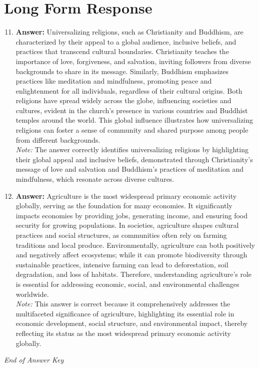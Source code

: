 \documentclass[12pt]{article}
\begin{document}
\section*{Long Form Response}
\begin{enumerate}[label=\arabic*.]
\setcounter{enumi}{10}
\item \textbf{Answer:} Universalizing religions, such as Christianity and Buddhism, are characterized by their appeal to a global audience, inclusive beliefs, and practices that transcend cultural boundaries. Christianity teaches the importance of love, forgiveness, and salvation, inviting followers from diverse backgrounds to share in its message. Similarly, Buddhism emphasizes practices like meditation and mindfulness, promoting peace and enlightenment for all individuals, regardless of their cultural origins. Both religions have spread widely across the globe, influencing societies and cultures, evident in the church's presence in various countries and Buddhist temples around the world. This global influence illustrates how universalizing religions can foster a sense of community and shared purpose among people from different backgrounds.
\\ \textit{Note:} The answer correctly identifies universalizing religions by highlighting their global appeal and inclusive beliefs, demonstrated through Christianity's message of love and salvation and Buddhism's practices of meditation and mindfulness, which resonate across diverse cultures.
\item \textbf{Answer:} Agriculture is the most widespread primary economic activity globally, serving as the foundation for many economies. It significantly impacts economies by providing jobs, generating income, and ensuring food security for growing populations. In societies, agriculture shapes cultural practices and social structures, as communities often rely on farming traditions and local produce. Environmentally, agriculture can both positively and negatively affect ecosystems; while it can promote biodiversity through sustainable practices, intensive farming can lead to deforestation, soil degradation, and loss of habitats. Therefore, understanding agriculture's role is essential for addressing economic, social, and environmental challenges worldwide.
\\ \textit{Note:} This answer is correct because it comprehensively addresses the multifaceted significance of agriculture, highlighting its essential role in economic development, social structure, and environmental impact, thereby reflecting its status as the most widespread primary economic activity globally.
\end{enumerate}

\vfill
\noindent\textit{End of Answer Key}
\end{document}
